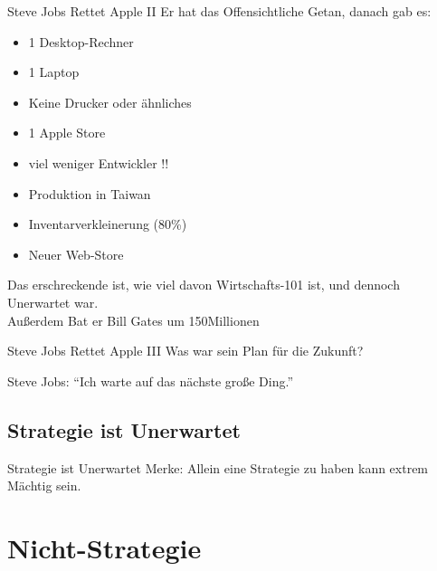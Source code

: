 \begin{frame}{Steve Jobs Rettet Apple II}
    \iffinal
    \small
    \fi
    Er hat das Offensichtliche Getan\pause,
    danach gab es:
    \begin{itemize}
        \item 1 Desktop-Rechner
        \item 1 Laptop
        \item Keine Drucker oder ähnliches
        \item 1 Apple Store
        \item viel weniger Entwickler !!
        \item Produktion in Taiwan
        \item Inventarverkleinerung (80\%)
        \item Neuer Web-Store
    \end{itemize}
    \iffinal
    \pause
    Das erschreckende ist, wie viel davon Wirtschafts-101 ist,
    und dennoch Unerwartet war. \\
    \pause
    Außerdem Bat er Bill Gates um 150Millionen
    \fi
\end{frame}

\begin{frame}[c]{Steve Jobs Rettet Apple III}
    \Large
    Was war sein Plan für die Zukunft? \\
    \pause

    Steve Jobs: ``Ich warte auf das nächste große Ding.''

\end{frame}

\subsection{Strategie ist Unerwartet}

\begin{frame}[c]{Strategie ist Unerwartet}
    \Large
    Merke: Allein eine Strategie zu haben kann extrem Mächtig sein.
\end{frame}



\section{Nicht-Strategie}

